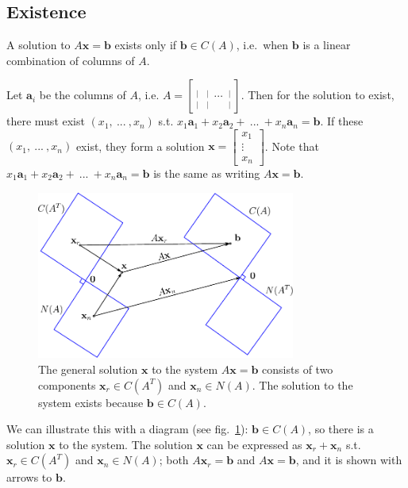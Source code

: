 \documentclass{acm_proc_article-sp}
\begin{document}
\subsection{Existence}

A solution to \(A \mathbf x = \mathbf b\) exists only if
\(\mathbf b \in C(A)\), i.e.~when \(\mathbf b\) is a linear combination
of columns of \(A\).

Let \(\mathbf a_i\) be the columns of \(A\), i.e. \(A = \left[ \mathop{\mathbf a_1}\limits_|^| \, \mathop{\mathbf a_2}\limits_|^| \ \cdots \  \mathop{\mathbf a_n}\limits_|^| \right]\).  Then for the solution to exist, there must exist \((x_1 , \ ... \ , x_n)\) s.t. \(x_1 \mathbf a_1 + x_2 \mathbf a_2 + \ ... \ + x_n \mathbf a_n = \mathbf b\). If these \((x_1, \ ... \ , x_n)\) exist, they form a solution \(\mathbf x = \begin{bmatrix} x_1 \\ \vdots \\ x_n \end{bmatrix}\).  Note that   \(x_1 \mathbf a_1 + x_2 \mathbf a_2 + \ ... \ + x_n \mathbf a_n = \mathbf b\) is the same as writing \(A \mathbf x = \mathbf b\).


\begin{figure}%
\centering
\includegraphics[width=8.5cm]{diagram1.pdf}
\caption{The general solution $\mathbf x$ to the system $A \mathbf x = \mathbf b$ consists of two components $\mathbf x_r \in C(A^T)$ and $\mathbf x_n \in N(A)$. The solution to the system exists because $\mathbf b \in C(A)$.}
\label{fig:diagram1}
\end{figure}


We can illustrate this with a diagram (see fig.~\ref{fig:diagram1}):
$\mathbf b \in C(A)$, so there is a solution $\mathbf x$ to the system.
The solution $\mathbf x$ can be expressed as $\mathbf x_r + \mathbf x_n$ s.t.
$\mathbf x_r \in C(A^T)$ and $\mathbf x_n \in N(A)$; both $A \mathbf x_r = \mathbf b$ and
$A \mathbf x = \mathbf b$, and it is shown with arrows to $\mathbf b$.
\end{document}
